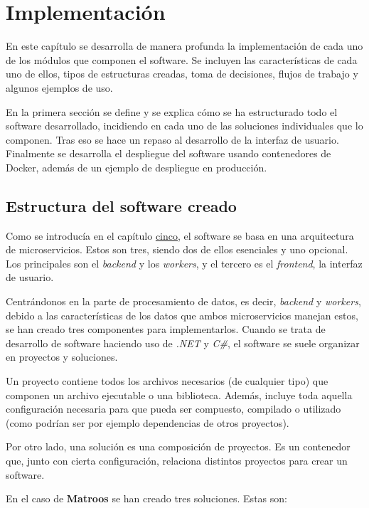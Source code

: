 \chapter{Implementación}

En este capítulo se desarrolla de manera profunda la implementación de cada uno de los módulos que componen el software. Se incluyen las características de cada uno de ellos, tipos de estructuras creadas, toma de decisiones, flujos de trabajo y algunos ejemplos de uso.

En la primera sección se define y se explica cómo se ha estructurado todo el software desarrollado, incidiendo en cada uno de las soluciones individuales que lo componen. Tras eso se hace un repaso al desarrollo de la interfaz de usuario. Finalmente se desarrolla el despliegue del software usando contenedores de Docker, además de un ejemplo de despliegue en producción.


\section{Estructura del software creado}

Como se introducía en el capítulo \hyperref[cap:5]{cinco}, el software se basa en una arquitectura de microservicios. Estos son tres, siendo dos de ellos esenciales y uno opcional. Los principales son el \textit{backend} y los \textit{workers}, y el tercero es el \textit{frontend}, la interfaz de usuario.

Centrándonos en la parte de procesamiento de datos, es decir, \textit{backend} y \textit{workers}, debido a las características de los datos que ambos microservicios manejan estos, se han creado tres componentes para implementarlos. Cuando se trata de desarrollo de software haciendo uso de \textit{.NET} y \textit{C\#}, el software se suele organizar en proyectos y soluciones.

Un proyecto contiene todos los archivos necesarios (de cualquier tipo) que componen un archivo ejecutable o una biblioteca. Además, incluye toda aquella configuración necesaria para que pueda ser compuesto, compilado o utilizado (como podrían ser por ejemplo dependencias de otros proyectos).

Por otro lado, una solución es una composición de proyectos. Es un contenedor que, junto con cierta configuración, relaciona distintos proyectos para crear un software.

En el caso de \textbf{Matroos} se han creado tres soluciones. Estas son:

